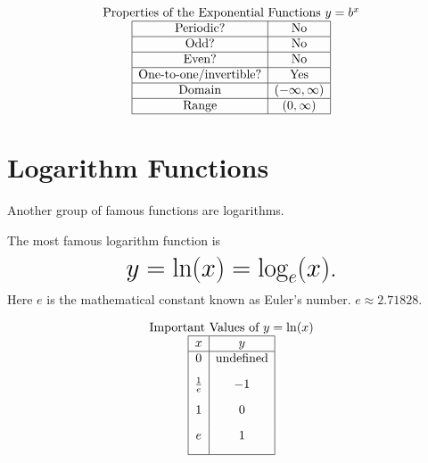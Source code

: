 \documentclass[nooutcomes]{ximera}
\begin{document}
\[
\begin{array}{c}
 \text{\normalfont Properties of the Exponential Functions } y=b^x \\
\begin{array}{|c|c|}
\hline
\text{Periodic?} & \text{No} \\ \hline
\text{Odd?} & \text{No} \\ \hline
\text{Even?} & \text{No} \\ \hline
\text{One-to-one/invertible?} & \text{Yes} \\ \hline
\text{Domain} & (-\infty,\infty)\\ \hline
\text{Range} & (0,\infty)\\ \hline
\end{array}
\end{array}
 \]



\newpage


\section{Logarithm Functions}
Another group of famous functions are logarithms.

\begin{example}
The most famous logarithm function is
 $$ \mbox{\huge $y=\ln(x)=\log_{e}(x)$.}$$ 
Here $e$ is the mathematical constant known as Euler's number. $e \approx 2.71828$.

\begin{center}
\end{center}


\[
\begin{array}{ c  }
  \text{Important Values of $y=\ln(x)$}\\
 \begin{array}{|c|c|}
 \hline
 x & y\\
 \hline
0&\text{undefined}\\[2ex]
\frac{1}{e}&-1\\[2ex]
1&0\\[2ex]
e&1\\[2ex]
 \hline
 \end{array}
\end{array}
 \]

\end{example}
\end{document}
